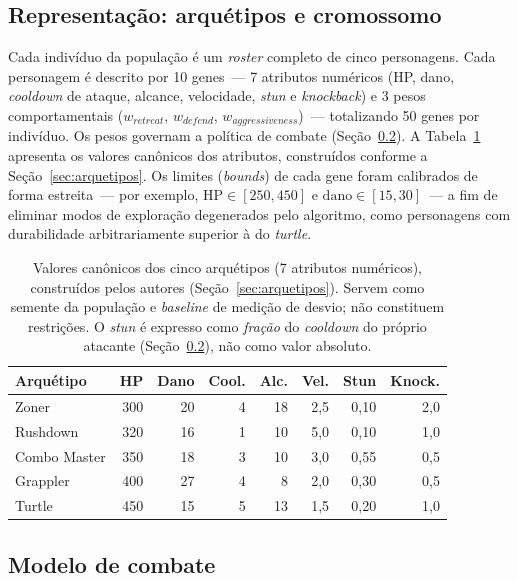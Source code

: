 \documentclass[12pt]{article}
\begin{document}
\subsection{Representação: arquétipos e cromossomo}

Cada indivíduo da população é um \emph{roster} completo de cinco personagens. Cada
personagem é descrito por 10 genes~--- 7 atributos numéricos (HP, dano,
\emph{cooldown} de ataque, alcance, velocidade, \emph{stun} e \emph{knockback}) e
3 pesos comportamentais ($w_{retreat}$, $w_{defend}$, $w_{aggressiveness}$)~---
totalizando 50 genes por indivíduo. Os pesos governam a política de combate
(Seção~\ref{sec:combate}). A Tabela~\ref{tab:canonicos} apresenta os valores
canônicos dos atributos, construídos conforme a Seção~\ref{sec:arquetipos}. Os
limites (\emph{bounds}) de cada gene foram calibrados de forma estreita~--- por
exemplo, $\mathrm{HP}\in [250,450]$ e $\mathrm{dano}\in [15,30]$~--- a fim de
eliminar modos de exploração degenerados pelo algoritmo, como personagens com
durabilidade arbitrariamente superior à do \emph{turtle}.

\begin{table}[ht]
\centering
\caption{Valores canônicos dos cinco arquétipos (7 atributos numéricos),
construídos pelos autores (Seção~\ref{sec:arquetipos}). Servem como semente da
população e \emph{baseline} de medição de desvio; não constituem restrições. O
\emph{stun} é expresso como \emph{fração} do \emph{cooldown} do próprio atacante
(Seção~\ref{sec:combate}), não como valor absoluto.}
\label{tab:canonicos}
\small
\begin{tabular}{lrrrrrrr}
\toprule
Arquétipo & HP & Dano & Cool. & Alc. & Vel. & Stun & Knock. \\
\midrule
Zoner        & 300 & 20 & 4 & 18 & 2{,}5 & 0{,}10 & 2{,}0 \\
Rushdown     & 320 & 16 & 1 & 10 & 5{,}0 & 0{,}10 & 1{,}0 \\
Combo Master & 350 & 18 & 3 & 10 & 3{,}0 & 0{,}55 & 0{,}5 \\
Grappler     & 400 & 27 & 4 &  8 & 2{,}0 & 0{,}30 & 0{,}5 \\
Turtle       & 450 & 15 & 5 & 13 & 1{,}5 & 0{,}20 & 1{,}0 \\
\bottomrule
\end{tabular}
\end{table}

\subsection{Modelo de combate}
\label{sec:combate}
\end{document}
